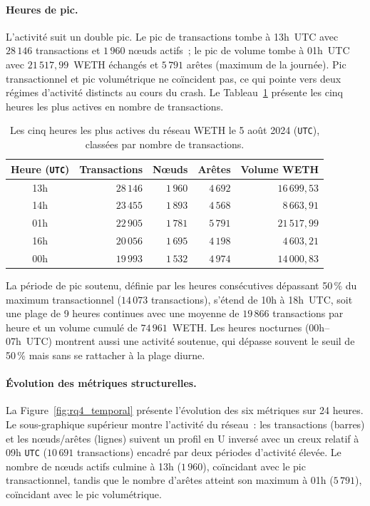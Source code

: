 \paragraph{Heures de pic.}
L'activit\'e suit un double pic. Le pic de transactions tombe \`a 13h~UTC avec $28\,146$ transactions et $1\,960$ n\oe{}uds actifs~; le pic de volume tombe \`a 01h~UTC avec $21\,517{,}99$~WETH \'echang\'es et $5\,791$ ar\^etes (maximum de la journ\'ee). Pic transactionnel et pic volum\'etrique ne co\"incident pas, ce qui pointe vers deux r\'egimes d'activit\'e distincts au cours du crash. Le Tableau~\ref{tab:rq4_peaks} pr\'esente les cinq heures les plus actives en nombre de transactions.

\begin{table}[H]
\centering
\caption{Les cinq heures les plus actives du r\'eseau WETH le 5 ao\^ut 2024 (\texttt{UTC}), class\'ees par nombre de transactions.}
\label{tab:rq4_peaks}
\begin{tabular}{crrrr}
\toprule
Heure (\texttt{UTC}) & Transactions & N\oe{}uds & Ar\^etes & Volume WETH \\
\midrule
13h & $28\,146$ & $1\,960$ & $4\,692$ & $16\,699{,}53$ \\
14h & $23\,455$ & $1\,893$ & $4\,568$ & $8\,663{,}91$ \\
01h & $22\,905$ & $1\,781$ & $5\,791$ & $21\,517{,}99$ \\
16h & $20\,056$ & $1\,695$ & $4\,198$ & $4\,603{,}21$ \\
00h & $19\,993$ & $1\,532$ & $4\,974$ & $14\,000{,}83$ \\
\bottomrule
\end{tabular}
\end{table}

La p\'eriode de pic soutenu, d\'efinie par les heures cons\'ecutives d\'epassant 50\,\% du maximum transactionnel ($14\,073$ transactions), s'\'etend de 10h \`a 18h~UTC, soit une plage de 9 heures continues avec une moyenne de $19\,866$ transactions par heure et un volume cumul\'e de $74\,961$~WETH. Les heures nocturnes (00h--07h~UTC) montrent aussi une activit\'e soutenue, qui d\'epasse souvent le seuil de 50\,\% mais sans se rattacher \`a la plage diurne.

\paragraph{\'Evolution des m\'etriques structurelles.}
La Figure~\ref{fig:rq4_temporal} pr\'esente l'\'evolution des six m\'etriques sur 24 heures. Le sous-graphique sup\'erieur montre l'activit\'e du r\'eseau~: les transactions (barres) et les n\oe{}uds/ar\^etes (lignes) suivent un profil en U invers\'e avec un creux relatif \`a 09h \texttt{UTC} ($10\,691$ transactions) encadr\'e par deux p\'eriodes d'activit\'e \'elev\'ee. Le nombre de n\oe{}uds actifs culmine \`a 13h ($1\,960$), co\"incidant avec le pic transactionnel, tandis que le nombre d'ar\^etes atteint son maximum \`a 01h ($5\,791$), co\"incidant avec le pic volum\'etrique.

